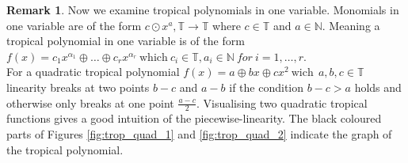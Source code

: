 \documentclass{article}
\theoremstyle{definition}
\newtheorem{remark}[theorem]{Remark}
\begin{document}
\begin{remark}
Now we examine tropical polynomials in one variable. Monomials in one variable are of the form $ c \odot x^{a}, \mathbb{T} \to \mathbb{T}$ where $c \in \mathbb{T}$ and $ a \in \mathbb{N} $. Meaning a tropical polynomial in one variable is of the form $f(x)=c_1x^{\alpha_1} \oplus \dots \oplus c_rx^{\alpha_r} \ \text{which} \ c_i \in \mathbb{T}, a_i \in \mathbb{N} \ for \ i=1, \dots , r$. \\
For a quadratic tropical polynomial $f(x) = a \oplus bx \oplus cx^{2} \ \text{wich} \ \ a,b,c \in \mathbb{T}$ linearity breaks at two points $b-c$ and $a-b$ if the condition $b-c > a$ holds and otherwise only breaks at one point $\frac{a-c}{2}$. Visualising two quadratic tropical functions gives a good intuition of the piecewise-linearity. The black coloured parts of Figures \ref{fig:trop_quad_1} and \ref{fig:trop_quad_2} indicate the graph of the tropical polynomial.


\end{remark}
\end{document}
